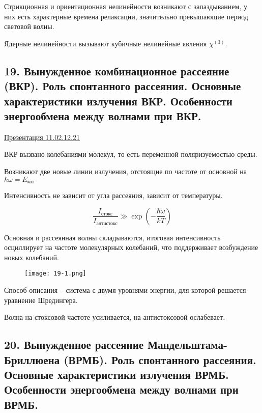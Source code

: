 \documentclass[11 pt]{article}
\begin{document}
    Стрикционная и ориентационная нелинейности возникают с запаздыванием, у них есть характерные времена релаксации, значительно превышающие период световой волны.

    Ядерные нелинейности вызывают кубичные нелинейные явления $\chi^{(3)}$.

    \subsection*{19. Вынужденное комбинационное рассеяние (ВКР). Роль спонтанного рассеяния. Основные характеристики излучения ВКР. Особенности энергообмена между волнами при ВКР.}

    \href{https://docs.google.com/presentation/d/1AFszmR3vaV3yd9CE1-JN2BAv94PDQvBh/edit#slide=id.p3}{Презентация 11.02.12.21}

    ВКР вызвано колебаниями молекул, то есть переменной поляризуемостью среды.

    Возникают две новые линии излучения, отстоящие по частоте от основной на $\hbar \omega = E_{\text{кол}}$

    Интенсивность не зависит от угла рассеяния, зависит от температуры.

    \begin{equation}
        \frac{I_{\text{стокс}}}{I_{\text{антистокс}}} \gg \exp(-\frac{\hbar \omega}{k T})
    \end{equation}

    Основная и рассеянная волны складываются, итоговая интенсивность осциллирует на частоте молекулярных колебаний, что поддерживает возбуждение новых колебаний.

    \begin{figure}[h]
        \centering
        \texttt{[image: 19-1.png]}
        \label{fig:my_label}
    \end{figure}

    Способ описания -- система с двумя уровнями энергии, для которой решается уравнение Шредингера.

    Волна на стоксовой частоте усиливается, на антистоксовой ослабевает.

    \subsection*{20. Вынужденное рассеяние Мандельштама-Бриллюена (ВРМБ). Роль спонтанного рассеяния. Основные характеристики излучения ВРМБ. Особенности энергообмена между волнами при ВРМБ.}
\end{document}

